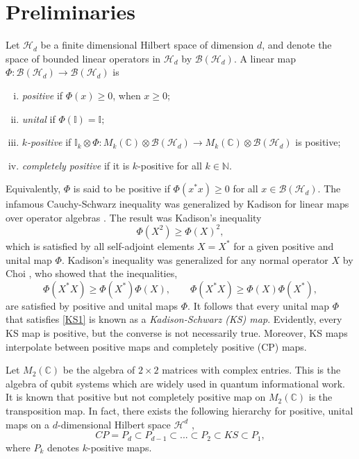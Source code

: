 \documentclass[11pt,reqno]{amsart}
\theoremstyle{definition}
\numberwithin{equation}{section} \setcounter{tocdepth}{1}
\numberwithin{equation}{section}
\begin{document}
\section{Preliminaries}

Let $\mathcal{H}_d$ be a finite dimensional Hilbert space of dimension $d$, and denote the space of bounded linear operators in $\mathcal{H}_d$ by $\mathcal{B}(\mathcal{H}_d)$. A linear map $\Phi:\mathcal{B}(\mathcal{H}_d) \rightarrow \mathcal{B}(\mathcal{H}_d)$ is
\begin{enumerate}[(i)]
    \item \textit{positive} if $\Phi(x)\geq 0$, when $x\geq0$;
    \item \textit{unital} if $\Phi(\mathbb{I})=\mathbb{I};$
    \item \textit{$k$-positive} if $\mathbb{I}_k \otimes \Phi:M_k(\mathbb{C}) \otimes \mathcal{B}(\mathcal{H}_d) \rightarrow M_k(\mathbb{C}) \otimes \mathcal{B}(\mathcal{H}_d)$ is positive;
    \item \textit{completely positive} if it is $k$-positive for all $k\in \mathbb{N}.$
\end{enumerate}

\noindent Equivalently, $\Phi$ is said to be positive if $\Phi(x^*x)\geq 0$ for all $x\in \mathcal{B}(\mathcal{H}_d).$ The infamous Cauchy-Schwarz inequality was generalized by Kadison for linear maps over operator algebras \cite{Kadison}. The result was Kadison's inequality
\begin{equation*}
    \Phi(X^2)\geq \Phi(X)^2,
\end{equation*} which is satisfied by all self-adjoint elements $X=X^*$ for a given positive and unital map $\Phi$. Kadison's inequality was generalized for any normal operator $X$ by Choi \cite{choi_positive_1975}, who showed that the inequalities,
\begin{equation}\label{KS1}
    \Phi(X^*X)\geq \Phi(X^*)\Phi(X), \qquad  \Phi(X^*X)\geq \Phi(X)\Phi(X^*),
\end{equation}are satisfied by positive and unital maps $\Phi$. It follows that every unital map $\Phi$ that satisfies \eqref{KS1} is known as a \textit{Kadison-Schwarz (KS) map}. Evidently, every KS map is positive, but the converse is not necessarily true. Moreover, KS maps interpolate between positive maps and completely positive (CP) maps.



\noindent Let $M_2(\mathbb{C})$ be the algebra of $2 \times 2$ matrices with complex entries. This is the algebra of qubit systems which are widely used in quantum informational work. It is known \cite{horodecki_necessary_1996} that positive but not completely positive map on $M_2(\mathbb{C})$ is the transposition map. In fact, there exists the following hierarchy for positive, unital maps on a $d$-dimensional Hilbert space $\mathcal{H}^d$ \cite{KS},
 \begin{equation}
     CP=P_d \subset P_{d-1}\subset ... \subset P_2 \subset KS \subset P_1,
 \end{equation}where $P_k$ denotes $k$-positive maps.
\end{document}
